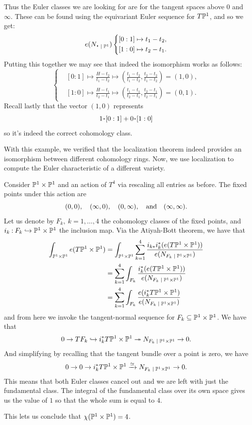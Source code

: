 \documentclass[12pt]{memoir}
\begin{document}
\begin{Ex}
Thus the Euler classes we are looking for are for the tangent spaces above $0$ and $\infty$. These can be found using the equivariant Euler sequence for $T\mathbb{P}^1$, and so we get:
$$e(N_{\.\mid\bP^1})\left\lbrace
\begin{aligned}
    &[0:1]\mapsto t_1-t_2,\\
    &[1:0]\mapsto t_2-t_1.
\end{aligned}
\right.$$
Putting this together we may see that indeed the isomorphism works as follows:
$$\left\lbrace
\begin{aligned}
    &[0:1]\mapsto \frac{H-t_2}{t_1-t_2}\mapsto\left(\frac{t_1-t_2}{t_1-t_2},\frac{t_2-t_2}{t_1-t_2}\right)=(1,0),\\
    &[1:0]\mapsto \frac{H-t_1}{t_2-t_1}\mapsto \left(\frac{t_1-t_1}{t_2-t_1},\frac{t_2-t_1}{t_2-t_1}\right)=(0,1).
\end{aligned}
\right.$$
Recall lastly that the vector $(1,0)$ represents 
$$1\.[0:1]+0\.[1:0]$$
so it's indeed the correct cohomology class.
\end{Ex}

With this example, we verified that the localization theorem indeed provides an isomorphism between different cohomology rings. Now, we use localization to compute the Euler characteristic of a different variety.

\begin{Ex}
    Consider $\mathbb{P}^1\times\mathbb{P}^1$ and an action of $T^4$ via rescaling all entries as before. The fixed points under this action are 
    $$(0,0),\quad(\infty,0),\quad(0,\infty),\quad\text{and}\quad(\infty,\infty).$$
    Let us denote by $F_k,\ k=1,\dots,4$ the cohomology classes of the fixed points, and $i_k\mathbin{:}F_k\hookrightarrow\mathbb{P}^1\times\mathbb{P}^1$ the inclusion map.
    Via the Atiyah-Bott theorem, we have that 
    \begin{align*}
    \int_{\bP^1\x\bP^1}e(T\bP^1\x\bP^1)&=\int_{\bP^1\x\bP^1}\sum_{k=1}^{4}\frac{i_{k\ast} i^\ast_k(e(T\bP^1\x\bP^1))}{e(N_{F_k\mid\bP^1\x\bP^1})}\\
    &=\sum_{k=1}^{4}\int_{F_k}\frac{ i^\ast_k(e(T\bP^1\x\bP^1))}{e(N_{F_k\mid\bP^1\x\bP^1})}\\
    &=\sum_{k=1}^{4}\int_{F_k}\frac{ e(i^\ast_kT\bP^1\x\bP^1)}{e(N_{F_k\mid\bP^1\x\bP^1})}
    \end{align*}
    and from here we invoke the tangent-normal sequence for $F_k\subseteq\mathbb{P}^1\times\mathbb{P}^1$. We have that 
    $$0\to TF_k\hookto i_k^\ast T\bP^1\x\bP^1\onto N_{F_k\mid\bP^1\x\bP^1}\to0.$$
    And simplifying by recalling that the tangent bundle over a point is zero, we have 
    $$0\to0\to i_k^\ast T\bP^1\x\bP^1\xrightarrow[]{\isom} N_{F_k\mid\bP^1\x\bP^1}\to0.$$
    This means that both Euler classes cancel out and we are left with just the fundamental class. The integral of the fundamental class over its own space gives us the value of $1$ so that the whole sum is equal to $4$.\par
    This lets us conclude that $\chi(\mathbb{P}^1\times\mathbb{P}^1)=4$.
\end{Ex}
\end{document}
